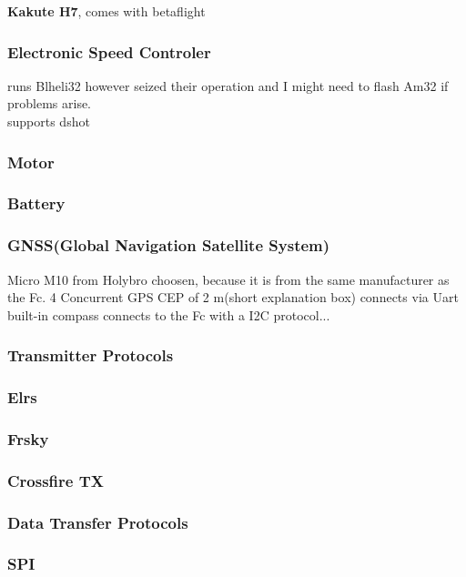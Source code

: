 \documentclass{article}
\begin{document}
	
	
	\textbf{Kakute H7}, comes with betaflight
	\subsubsection[ESC]{Electronic Speed Controler}
	runs Blheli32 however seized their operation and I might need to flash Am32 if problems arise.
	\\supports dshot 
	
	\subsubsection{Motor}
	
	\subsubsection{Battery}
	
	
	\subsubsection{GNSS(Global Navigation Satellite System)}
	Micro M10 from Holybro choosen, because it is from the same manufacturer as the Fc.
	4 Concurrent GPS
	CEP of 2 m(short explanation box)
	connects via Uart
	\\ built-in compass connects to the Fc with a I2C protocol...
	
	
	

	\subsubsection{Transmitter Protocols}
	\subsubsection*{Elrs}
	\subsubsection*{Frsky}
	\subsubsection*{Crossfire TX}
	
	\subsubsection{Data Transfer Protocols}
	\subsubsection*{SPI}
\end{document}
